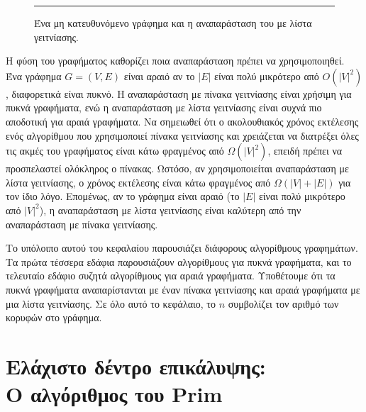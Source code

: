 \documentclass[12pt,a4paper]{article} %
\begin{document}
\begin{figure}[ht]
\begin{minipage}{0.45\textwidth}

\end{minipage}

\vspace{0.3cm}
\noindent\rule{\textwidth}{0.2pt}
\caption{Ένα μη κατευθυνόμενο γράφημα και η αναπαράσταση του με λίστα γειτνίασης.}
\label{fig:graph3}
\end{figure}
\vspace{2cm}


Η φύση του γραφήματος καθορίζει ποια αναπαράσταση πρέπει να χρησιμοποιηθεί. Ένα γράφημα $G = (V, E)$ είναι αραιό αν το $|E|$ είναι πολύ μικρότερο από $O(|V|^2)$, διαφορετικά είναι πυκνό. Η αναπαράσταση με πίνακα γειτνίασης είναι χρήσιμη για πυκνά γραφήματα, ενώ η αναπαράσταση με λίστα γειτνίασης είναι συχνά πιο αποδοτική για αραιά γραφήματα. Να σημειωθεί ότι ο ακολουθιακός χρόνος εκτέλεσης ενός αλγορίθμου που χρησιμοποιεί πίνακα γειτνίασης και χρειάζεται να διατρέξει όλες τις ακμές του γραφήματος είναι κάτω φραγμένος από $\Omega(|V|^2)$, επειδή πρέπει να προσπελαστεί ολόκληρος ο πίνακας. Ωστόσο, αν χρησιμοποιείται αναπαράσταση με λίστα γειτνίασης, ο χρόνος εκτέλεσης είναι κάτω φραγμένος από $\Omega(|V| + |E|)$ για τον ίδιο λόγο. Επομένως, αν το γράφημα είναι αραιό (το $|E|$ είναι πολύ μικρότερο από $|V|^2$), η αναπαράσταση με λίστα γειτνίασης είναι καλύτερη από την αναπαράσταση με πίνακα γειτνίασης.
\begin{sloppypar}
Το υπόλοιπο αυτού του κεφαλαίου παρουσιάζει διάφορους αλγορίθμους γραφημάτων. Τα πρώτα τέσσερα εδάφια παρουσιάζουν αλγορίθμους για πυκνά γραφήματα, και το τελευταίο εδάφιο συζητά αλγορίθμους για αραιά γραφήματα. Υποθέτουμε ότι τα πυκνά γραφήματα αναπαρίστανται με έναν πίνακα γειτνίασης και αραιά γραφήματα με μια λίστα γειτνίασης. Σε όλο αυτό το κεφάλαιο, το $n$ συμβολίζει τον αριθμό των κορυφών στο γράφημα.
\end{sloppypar}
\vspace{1cm}


\section[Ελάχιστο δέντρο επικάλυψης: Ο αλγόριθμος του Prim]{Ελάχιστο δέντρο επικάλυψης: \protect\\ Ο αλγόριθμος του Prim}
\end{document}
